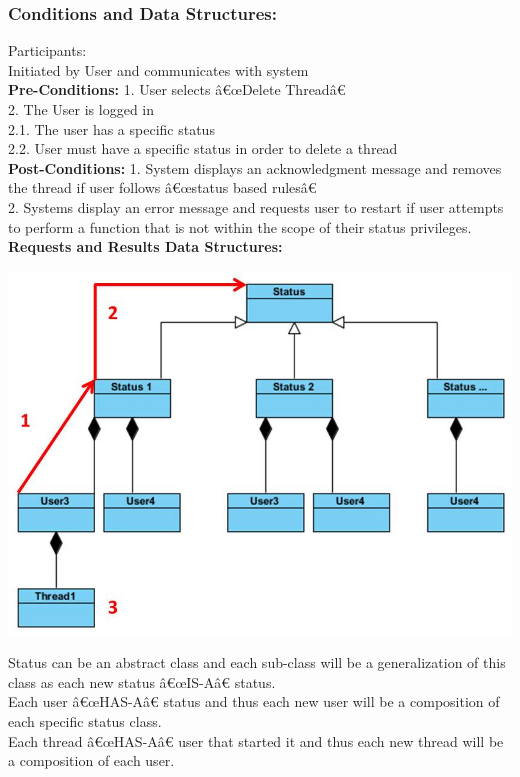 \documentclass[a4paper,11pt]{article}
\begin{document}
\subsubsection{Conditions and Data Structures:}
Participants:\\
Initiated by User and communicates with system\\
\textbf{Pre-Conditions:}
1.	User selects â€œDelete Threadâ€ \\
2.	The User is logged in \\
2.1.	The user has a specific status\\
2.2.	User must have a specific status in order to delete a thread\\
\textbf{Post-Conditions:}
1.	System displays an acknowledgment message and removes  the thread  if user follows â€œstatus based rulesâ€\\
2.	Systems display an error message and requests user to restart if user attempts to perform a function that is not within the scope of their status privileges.\\
\textbf{Requests and Results Data Structures:}
\begin{center}
\includegraphics[width=1\linewidth]{./Images/CRUDThread/Diagrams/13.jpg}\\
\end{center}
Status can be an abstract class and each sub-class will be a generalization of this class as each new status â€œIS-Aâ€ status.\\
Each user â€œHAS-Aâ€ status and thus each new user will be a composition of each specific status class.\\
Each thread â€œHAS-Aâ€ user that started it and thus each new thread will be a composition of each user.\\
\end{document}
